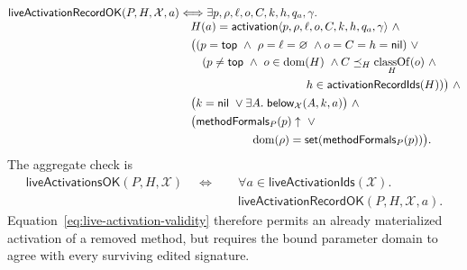 \begin{equation}\label{eq:live-activation-record-validity}
\begin{aligned}
 \mathsf{liveActivationRecordOK}(P,H,\mathcal X,a)
 &\Longleftrightarrow
 \exists p,\rho,\ell,o,C,k,h,q_a,\gamma.\;\\[-1mm]
 &\quad H(a)=\kw{activation}\langle
       p,\rho,\ell,o,C,k,h,q_a,\gamma\rangle\ \land\\
 &\quad\bigl((p=\kw{top}\ \land\ \rho=\ell=\varnothing\ \land
              o=C=h=\nil)\ \lor\\
 &\qquad(p\ne\kw{top}\ \land\ o\in\dom(H)\ \land
          C\preceq_H\classof_H(o)\ \land\\
 &\hspace{39mm}h\in\mathsf{activationRecordIds}(H))\bigr)\ \land\\
 &\quad\bigl(k=\nil\ \lor
       \exists A.\;\mathsf{below}_{\mathcal X}(A,k,a)\bigr)\ \land\\
 &\quad\bigl(\mathsf{methodFormals}_{P}(p)\uparrow\ \lor\\
 &\hspace{22mm}\dom(\rho)=
       \mathsf{set}(\mathsf{methodFormals}_{P}(p))\bigr).
\end{aligned}
\end{equation}
The aggregate check is
\begin{equation}\label{eq:live-activation-validity}
\begin{split}
 \mathsf{liveActivationsOK}(P,H,\mathcal X)
 \quad\Longleftrightarrow\quad{}
 &\forall a\in\mathsf{liveActivationIds}(\mathcal X).\\[-1mm]
 &\mathsf{liveActivationRecordOK}(P,H,\mathcal X,a).
\end{split}
\end{equation}
Equation~\eqref{eq:live-activation-validity} therefore permits an already
materialized activation of a removed method, but requires the bound parameter
domain to agree with every surviving edited signature.

